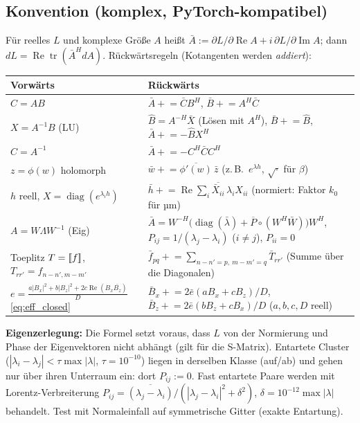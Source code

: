 \subsection{Konvention (komplex, PyTorch-kompatibel)}
Für reelles $L$ und komplexe Größe $A$ heißt $\bar A:=\partial L/\partial\operatorname{Re}A+i\,\partial L/\partial\operatorname{Im}A$;
dann $dL=\operatorname{Re}\operatorname{tr}(\bar A^HdA)$. Rückwärtsregeln (Kotangenten werden \emph{addiert}):
\begin{center}
\small
\begin{tabular}{p{4.2cm}p{10.2cm}}
\toprule
Vorwärts & Rückwärts \\
\midrule
$C=AB$ & $\bar A\mathrel{+}=\bar CB^H$, $\bar B\mathrel{+}=A^H\bar C$ \\
$X=A^{-1}B$ (LU) & $\hat B=A^{-H}\bar X$ (Lösen mit $A^H$), $\bar B\mathrel{+}=\hat B$, $\bar A\mathrel{+}=-\hat BX^H$ \\
$C=A^{-1}$ & $\bar A\mathrel{+}=-C^H\bar CC^H$ \\
$z=\phi(w)$ holomorph & $\bar w\mathrel{+}=\overline{\phi'(w)}\,\bar z$ (z.\,B.\ $e^{\lambda h}$, $\sqrt{\cdot}$ für $\beta$) \\
$h$ reell, $X=\operatorname{diag}(e^{\lambda_ih})$ & $\bar h\mathrel{+}=\operatorname{Re}\sum_i\overline{\bar X_{ii}}\,\lambda_iX_{ii}$ (normiert: Faktor $k_0$ für µm) \\
$A=W\Lambda W^{-1}$ (Eig) & $\bar A=W^{-H}\big(\operatorname{diag}(\bar\lambda)+\overline{P}\circ(W^H\bar W)\big)W^H$,
  $P_{ij}=1/(\lambda_j-\lambda_i)$ ($i\neq j$), $P_{ii}=0$ \\
Toeplitz $T=[\![f]\!]$, $T_{rr'}=f_{n-n',m-m'}$ & $\bar f_{pq}\mathrel{+}=\sum_{n-n'=p,\ m-m'=q}\bar T_{rr'}$ (Summe über die Diagonalen) \\
$e=\frac{a|B_x|^2+b|B_z|^2+2c\operatorname{Re}(B_x\overline{B_z})}{D}$ \eqref{eq:eff_closed} &
  $\bar B_x\mathrel{+}=2\bar e(aB_x+cB_z)/D$, $\bar B_z\mathrel{+}=2\bar e(bB_z+cB_x)/D$ ($a,b,c,D$ reell) \\
\bottomrule
\end{tabular}
\end{center}
\textbf{Eigenzerlegung:} Die Formel setzt voraus, dass $L$ von der Normierung und Phase der Eigenvektoren nicht abhängt
(gilt für die S-Matrix). Entartete Cluster ($|\lambda_i-\lambda_j|<\tau\max|\lambda|$, $\tau=10^{-10}$) liegen in derselben
Klasse (auf/ab) und gehen nur über ihren Unterraum ein: dort $P_{ij}:=0$. Fast entartete Paare werden mit
Lorentz-Verbreiterung $P_{ij}=\overline{(\lambda_j-\lambda_i)}/(|\lambda_j-\lambda_i|^2+\delta^2)$, $\delta=10^{-12}\max|\lambda|$
behandelt. Test mit Normaleinfall auf symmetrische Gitter (exakte Entartung).

